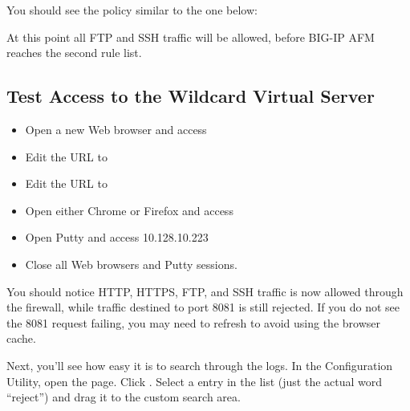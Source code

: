 \documentclass[letterpaper,10pt,english]{sphinxmanual}
\begin{document}

You should see the policy similar to the one below:


At this point all FTP and SSH traffic will be allowed, before BIG-IP AFM
reaches the second rule list.


\subsection{Test Access to the Wildcard Virtual Server}
\label{\detokenize{class1/module1/lab5:test-access-to-the-wildcard-virtual-server}}\begin{itemize}
\item {} 
Open a new Web browser and access

\item {} 
Edit the URL to 

\item {} 
Edit the URL to 

\item {} 
Open either Chrome or Firefox and access

\item {} 
Open Putty and access 10.128.10.223

\item {} 
Close all Web browsers and Putty sessions.

\end{itemize}

You should notice HTTP, HTTPS, FTP, and SSH traffic is now allowed
through the firewall, while traffic destined to port 8081 is still
rejected. If you do not see the 8081 request failing, you may need to
refresh to avoid using the browser cache.

Next, you’ll see how easy it is to search through the logs. In the
Configuration Utility, open the  page. Click . Select a  entry
in the list (just the actual word “reject”) and drag it to the custom
search area.

\end{document}
